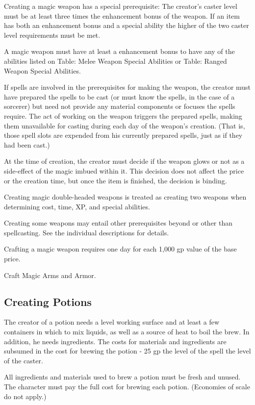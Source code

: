 Creating a magic weapon has a special prerequisite: The creator's caster level must be at least three times the enhancement bonus of the weapon. If an item has both an enhancement bonus and a special ability the higher of the two caster level requirements must be met.

A magic weapon must have at least a  enhancement bonus to have any of the abilities listed on Table: Melee Weapon Special Abilities or Table: Ranged Weapon Special Abilities.

If spells are involved in the prerequisites for making the weapon, the creator must have prepared the spells to be cast (or must know the spells, in the case of a sorcerer) but need not provide any material components or focuses the spells require. The act of working on the weapon triggers the prepared spells, making them unavailable for casting during each day of the weapon's creation. (That is, those spell slots are expended from his currently prepared spells, just as if they had been cast.)

At the time of creation, the creator must decide if the weapon glows or not as a side-effect of the magic imbued within it. This decision does not affect the price or the creation time, but once the item is finished, the decision is binding.

Creating magic double-headed weapons is treated as creating two weapons when determining cost, time, XP, and special abilities.

Creating some weapons may entail other prerequisites beyond or other than spellcasting. See the individual descriptions for details.

Crafting a magic weapon requires one day for each 1,000 gp value of the base price.

 Craft Magic Arms and Armor.

\subsection{Creating Potions}

The creator of a potion needs a level working surface and at least a few containers in which to mix liquids, as well as a source of heat to boil the brew. In addition, he needs ingredients. The costs for materials and ingredients are subsumed in the cost for brewing the potion - 25 gp \x  the level of the spell \x  the level of the caster.

All ingredients and materials used to brew a potion must be fresh and unused. The character must pay the full cost for brewing each potion. (Economies of scale do not apply.)

